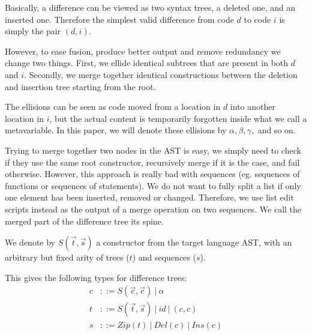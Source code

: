 \documentclass[a4paper,10pt]{article}
\newcommand{\typsep}{\ |\ }
\begin{document}
Basically, a difference can be viewed as two syntax trees, a deleted one, and an inserted one. Therefore the simplest valid difference from code $d$ to code $i$ is simply the pair $(d, i)$.

However, to ease fusion, produce better output and remove redundancy we change two things.
First, we ellide identical subtrees that are present in both $d$ and $i$.
Secondly, we merge together identical constructions between the deletion and insertion tree starting from the root.

The ellisions can be seen as code moved from a location in $d$ into another location in $i$, but the actual content is temporarily forgotten inside what we call a metavariable. In this paper, we will denote these ellisions by $\alpha, \beta, \gamma,$ and so on.

Trying to merge together two nodes in the AST is easy, we simply need to check if they use the same root constructor, recursively merge if it is the case, and fail otherwise. However, this approach is really bad with sequences (eg. sequences of functions or sequences of statements). We do not want to fully split a list if only one element has been inserted, removed or changed. Therefore, we use list edit scripts instead as the output of a merge operation on two sequences. We call the merged part of the difference tree its spine.

We denote by $S(\overrightarrow{t}, \overrightarrow{s})$ a constructor from the target language AST, with an arbitrary but fixed arity of trees ($t$) and sequences ($s$).

This gives the following types for difference trees:
\begin{align*}
c &::= S(\overrightarrow{c}, \overrightarrow{c}) \typsep \alpha\\
t &::= S(\overrightarrow{t}, \overrightarrow{s}) \typsep id \typsep (c, c)\\
s &::= Zip(t) \typsep Del(c) \typsep Ins(c)\\
\end{align*}
\end{document}
